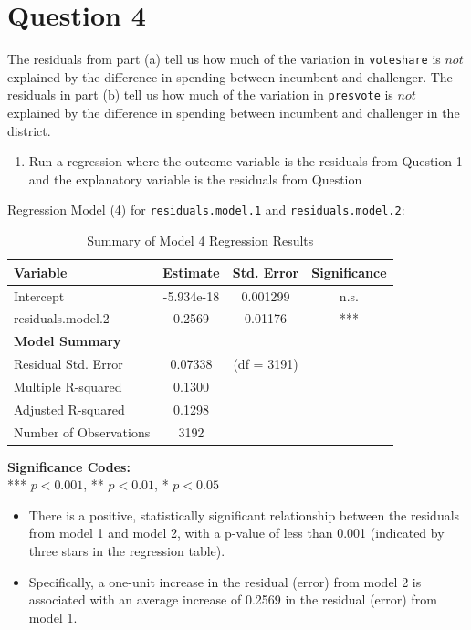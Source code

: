 \documentclass[12pt,letterpaper]{article}
\begin{document}
\section*{Question 4}
\noindent The residuals from part (a) tell us how much of the variation in \texttt{voteshare} is $not$ explained by the difference in spending between incumbent and challenger. The residuals in part (b) tell us how much of the variation in \texttt{presvote} is $not$ explained by the difference in spending between incumbent and challenger in the district.
\vspace{0.5cm} \noindent\begin{enumerate}[left=0pt]
\item Run a regression where the outcome variable is the residuals from Question 1 and the explanatory variable is the residuals from Question 
\end{enumerate}
\noindent Regression Model (4) for \texttt{residuals.model.1} and \texttt{residuals.model.2}: 
\noindent
\begin{table}[h!]
	\centering
	\caption{Summary of Model 4 Regression Results}
	\vspace{0.25cm}
	\begin{tabular}{lccc}
		\toprule
		\textbf{Variable} & \textbf{Estimate} & \textbf{Std. Error} & \textbf{Significance} \\ 
		\midrule
		Intercept              & -5.934e-18 & 0.001299 & n.s. \\ 
		residuals.model.2      & 0.2569     & 0.01176  & *** \\ 
		\midrule
		\textbf{Model Summary} & & & \\
		Residual Std. Error    & 0.07338  & (df = 3191) & \\ 
		Multiple R-squared     & 0.1300   & & \\ 
		Adjusted R-squared     & 0.1298   & & \\ 
		Number of Observations & 3192     & & \\ 
		\bottomrule
	\end{tabular}
\end{table}

\vspace{0.1cm}
\noindent\textbf{Significance Codes:} \\
*** $p < 0.001$, ** $p < 0.01$, * $p < 0.05$

\vspace{0.5cm} \begin{itemize}[left=0pt, label=\textbullet]
	\item
	\noindent There is a positive, statistically significant relationship between the residuals from model 1 and model 2, with a p-value of less than 0.001 (indicated by three stars in the regression table).
	\item
	\noindent Specifically, a one-unit increase in the residual (error) from model 2 is associated with an average increase of 0.2569 in the residual (error) from model 1.  
\end{itemize}
\end{document}

